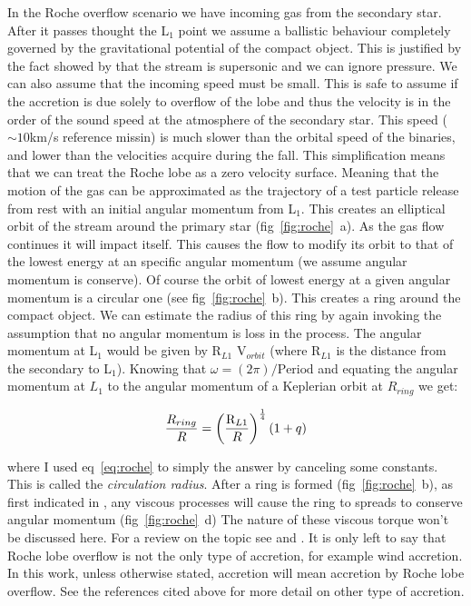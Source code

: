 In the Roche overflow scenario we have incoming gas from the secondary star. After it passes thought the L$_1$ point we assume a ballistic behaviour completely governed by the gravitational potential of the compact object. This is justified by the fact showed by \citep{lubow_gas_1975} that the stream is supersonic and we can ignore pressure. We can also assume that the incoming speed must be small. This is safe to assume if the accretion is due solely to overflow of the lobe and thus the velocity is in the order of the sound speed at the atmosphere of the secondary star. This speed ($\sim 10 $km/s reference missin) is much slower than the orbital speed of the binaries,  and lower than the velocities acquire during the fall. This simplification means that we can treat the Roche lobe as a zero velocity surface. Meaning that the motion of the gas can be approximated as the trajectory of a test particle release from rest with an initial angular momentum from L$_1$. This creates an elliptical orbit of the stream around the primary star (fig~\ref{fig:roche}~a). As the gas flow continues it will impact itself. This causes the flow to modify its orbit to that of the lowest energy at an specific angular momentum (we assume angular momentum is conserve). Of course the orbit of lowest energy at a given angular momentum is a circular one (see fig~\ref{fig:roche}~b). This creates a ring around the compact object.  We can estimate the radius of this ring by again invoking the assumption that no angular momentum is loss in the process. The angular momentum at L$_1$ would be given by  R$_{L1}$  V$_{orbit}$ (where R$_{L1}$ is the distance from the secondary to L$_1$). Knowing that $\omega = (2 \pi)/\text{Period}$ and equating the angular momentum at $L_1$ to the angular momentum of a Keplerian orbit at $R_{ring}$ we get:


\begin{equation}
        \frac{R_{ring}}{R} = \left ( \frac{\text R _{L1}}{R} \right ) ^{\frac{1}{4}} (1+q)
\end{equation}

where I used eq~\ref{eq:roche} to simply the answer by canceling some constants. This is called the \emph{circulation radius}. After a ring is formed (fig~\ref{fig:roche}~b), as first indicated in \cite{lynden-bell_evolution_1974}, any viscous processes will cause the ring to spreads to conserve angular momentum (fig~\ref{fig:roche}~d) The nature of these viscous torque won't be discussed here. For a review on the topic see \cite{frank_accretion_2002} and \cite{verbunt_accretion_1982}. It is only left to say that Roche lobe overflow is not the only type of accretion, for example wind accretion. In this work, unless otherwise stated, accretion will mean accretion by Roche lobe overflow. See the references cited above for more detail on other type of accretion. \\


